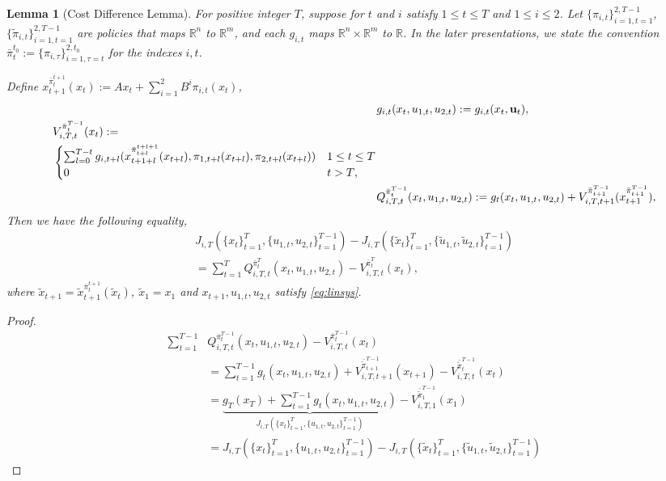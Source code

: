 \documentclass{article}
\newtheorem{lemma}{Lemma}
\begin{document}
\begin{lemma}[Cost Difference Lemma]
For positive integer $T$, suppose for $t$ and $i$ satisfy $1 \leq t \leq T$ and $1 \leq i \leq 2$. Let 
$\{\pi_{i,t}\}_{i=1,t=1}^{2,T-1}$,$\{\tilde{\pi}_{i,t}\}_{i=1,t=1}^{2,T-1}$ are policies that maps $\mathbb{R}^{n}$ to $\mathbb{R}^{m}$, and each $g_{i,t}$ maps $\mathbb{R}^{n} \times \mathbb{R}^{m}$ to $\mathbb{R}$. In the later presentations, we state the convention $\bar{\pi}_{t}^{t_{0}} := \{\pi_{i,\tau}\}_{i=1,\tau=t}^{2,t_{0}}$ for the indexes $i,t$.

Define $x_{t+1}^{\bar{\pi}_{t}^{t+1}}(x_{t}):= Ax_{t} + \sum_{i=1}^{2} B^{i}\pi_{i,t}(x_{t})$,
\begin{align}
&g_{i,t}(x_{t}, u_{1,t}, u_{2,t}) := g_{i,t}(x_{t}, \mathbf{u}_{t}),\\
\begin{split}
    &V_{i,T,t}^{\bar{\pi}_{t}^{T-1}}(x_{t}) := \\
    &\begin{cases}
        \sum_{l=0}^{T-t} g_{i,t+l}(x_{t+1+l}^{\bar{\pi}_{t+l}^{t+l+1}}(x_{t+l}),\pi_{1,t+l}(x_{t+l}),\pi_{2,t+l}(x_{t+l})) & \text{$1 \leq t \leq T$}\\
        $0$ & \text{$t > T$},
    \end{cases}
\end{split}
    \\
    &Q_{i,T,t}^{\bar{\pi}_{t}^{T-1}}(x_{t},u_{1,t},u_{2,t}) := g_{t}(x_{t},u_{1,t},u_{2,t}) + V_{i,T,t+1}^{\bar{\pi}_{t+1}^{T-1}}(x_{t+1}^{\bar{\pi}_{t+1}^{T-1}})
    ,
\end{align}
Then we have the following equality,
\begin{align}
    J_{i,T}(\{x_{t}\}_{t=1}^{T},\{u_{1,t},u_{2,t}\}_{t=1}^{T-1}) - J_{i,T}(\{\tilde{x}_{t}\}_{t=1}^{T},\{\tilde{u}_{1,t},\tilde{u}_{2,t}\}_{t=1}^{T-1})\\
    = \sum_{t=1}^{T} Q_{i,T,t}^{\bar{\pi}_{t}^{T}}(x_{t},u_{1,t},u_{2,t}) -  V_{i,T,t}^{\bar{\pi}_{t}^{T}}(x_{t}),
\end{align}
where $\tilde{x}_{t+1} = \tilde{x}_{t+1}^{\bar{\pi}_{t}^{t+1}}(\tilde{x}_{t})$, $\tilde{x}_{1} = x_{1}$ and $x_{t+1},u_{1,t},u_{2,t}$ satisfy \eqref{eq:linsys}.
\end{lemma}

\begin{proof}
\begin{align*}
    \sum_{t=1}^{T-1} &Q_{i,T,t}^{\bar{\pi}_{t}^{T-1}}(x_{t},u_{1,t},u_{2,t}) -  V_{i,T,t}^{\bar{\pi}_{t}^{T-1}}(x_{t}) \\
    &= \sum_{t=1}^{T-1} g_{t}(x_{t},u_{1,t},u_{2,t})+ V_{i,T,t+1}^{\bar{\tilde{\pi}}_{t+1}^{T-1}}(x_{t+1})-V_{i,T,t}^{\bar{\tilde{\pi}}_{t}^{T-1}}(x_{t})\\
    &= \underbrace{g_{T}(x_{T}) + \sum_{t=1}^{T-1} g_{t}(x_{t},u_{1,t},u_{2,t})}_{J_{i,T}(\{x_{t}\}_{t=1}^{T},\{u_{1,t},u_{2,t}\}_{t=1}^{T-1})} - V_{i,T,1}^{\bar{\tilde{\pi}}_{1}^{T-1}}(x_{1})\\
    &= J_{i,T}(\{x_{t}\}_{t=1}^{T},\{u_{1,t},u_{2,t}\}_{t=1}^{T-1}) - J_{i,T}(\{\tilde{x}_{t}\}_{t=1}^{T},\{\tilde{u}_{1,t},\tilde{u}_{2,t}\}_{t=1}^{T-1})
\end{align*}
\end{proof}
\end{document}
